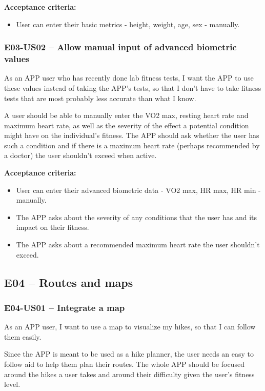\textbf{Acceptance criteria:}
\begin{itemize}
    \item User can enter their basic metrics - height, weight, age, sex - manually.
\end{itemize}

\subsubsection*{E03-US02 -- Allow manual input of advanced biometric values}
As an APP user who has recently done lab fitness tests, I want the APP to use these values instead of taking the APP's tests, so that I don't have to take fitness tests that are most probably less accurate than what I know.

A user should be able to manually enter the VO2 max, resting heart rate and maximum heart rate, as well as the severity of the effect a potential condition might have on the individual's fitness.
The APP should ask whether the user has such a condition and if there is a maximum heart rate (perhaps recommended by a doctor) the user shouldn't exceed when active.

\textbf{Acceptance criteria:}
\begin{itemize}
    \item User can enter their advanced biometric data - VO2 max, HR max, HR min - manually.
    \item The APP asks about the severity of any conditions that the user has and its impact on their fitness.
    \item The APP asks about a recommended maximum heart rate the user shouldn't exceed.
\end{itemize}


\subsection*{E04 -- Routes and maps}

\subsubsection*{E04-US01 -- Integrate a map}
As an APP user, I want to use a map to visualize my hikes, so that I can follow them easily.

Since the APP is meant to be used as a hike planner, the user needs an easy to follow aid to help them plan their routes.
The whole APP should be focused around the hikes a user takes and around their difficulty given the user's fitness level.

